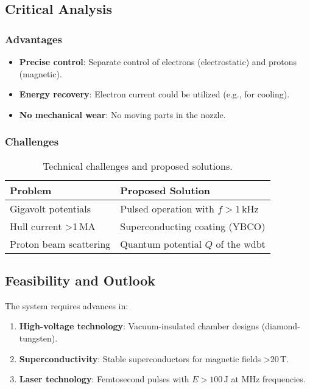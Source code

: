\subsection{Critical Analysis}
\subsubsection*{Advantages}
\begin{itemize}
    \item \textbf{Precise control}: Separate control of electrons (electrostatic) and protons (magnetic).
    \item \textbf{Energy recovery}: Electron current could be utilized (e.g., for cooling).
    \item \textbf{No mechanical wear}: No moving parts in the nozzle.
\end{itemize}

\subsubsection*{Challenges}
\begin{table}[ht]
    \centering
    \begin{tabular}{ll}
        \toprule
        \textbf{Problem} & \textbf{Proposed Solution} \\
        \midrule
        Gigavolt potentials & Pulsed operation with $f > 1\,\text{kHz}$ \\
        Hull current >1\,MA & Superconducting coating (YBCO) \\
        Proton beam scattering & Quantum potential $Q$ of the \gls{wdbt} \\
        \bottomrule
    \end{tabular}
    \caption{Technical challenges and proposed solutions.}
    \label{tab:problems}
\end{table}

\subsection{Feasibility and Outlook}
The system requires advances in:
\begin{enumerate}
    \item \textbf{High-voltage technology}: Vacuum-insulated chamber designs (diamond-tungsten).
    \item \textbf{Superconductivity}: Stable superconductors for magnetic fields >20\,T.
    \item \textbf{Laser technology}: Femtosecond pulses with $E > 100\,\text{J}$ at MHz frequencies.
\end{enumerate}

